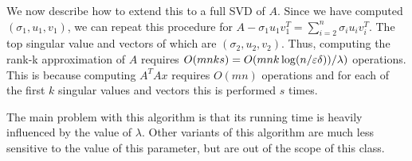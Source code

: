 \documentclass{article}
\begin{document}
We now describe how to extend this to a full SVD of $A$. Since we have computed $(\sigma_1,u_1,v_1)$, we can repeat this
procedure for $A - \sigma_{1}u_{1}v_{1}^{T} = \sum_{i=2}^{n}{\sigma_{i}u_{i}v_{i}^{T}}$. The top singular value and vectors of which are $(\sigma_2,u_2,v_2)$.
Thus, computing the rank-k approximation of $A$ requires $O(mnks)  = O(mnk\log(n/\varepsilon\delta))/\lambda)$ operations. 
This is because computing $A^{T}Ax$ requires $O(mn)$ operations and
for each of the first $k$ singular values and vectors this is performed $s$ times. 

The main problem with this algorithm is that its running time is heavily influenced by the value of $\lambda$.
Other variants of this algorithm are much less sensitive to the value of this parameter, but are out of the scope of this class. 
\end{document}
